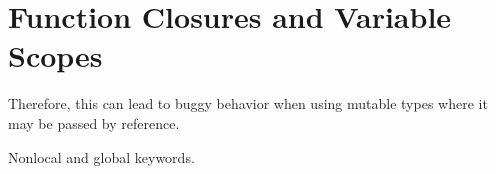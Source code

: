 \section{Function Closures and Variable Scopes}

  Therefore, this can lead to buggy behavior when using mutable types where it may be passed by reference. 

  Nonlocal and global keywords. 

